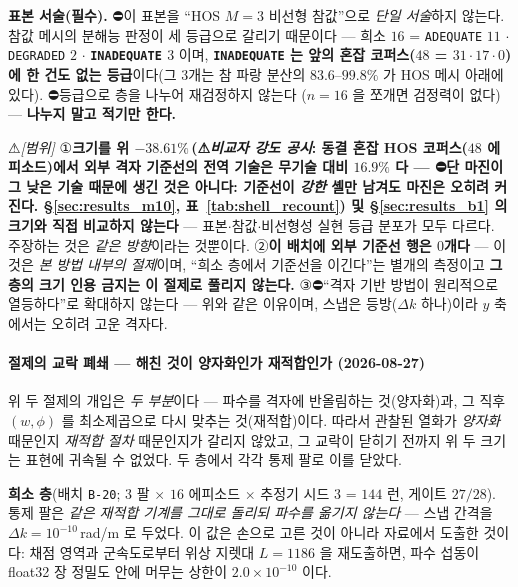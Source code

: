 \documentclass[11pt]{report}
\numberwithin{equation}{chapter}
\numberwithin{figure}{chapter}
\numberwithin{table}{chapter}
\newcommand{\CmpSkill}{\,(⚠\emph{비교자 강도 공시}: 동결 혼잡 HOS 코퍼스($48$ 에피소드)에서
\textbf{외부 격자 기준선}의 전역 기술은 무기술 대비 $16.9\%$ 다 --- ⛔단 마진이 그 낮은
기술 때문에 생긴 것은 아니다: 기준선이 \emph{강한} 셸만 남겨도 마진은 오히려 커진다.
\S\ref{sec:results_m10}, 표~\ref{tab:shell_recount})}
\begin{document}
\textbf{표본 서술(필수).} ⛔이 표본을 ``HOS $M{=}3$ 비선형 참값''으로 \emph{단일
서술}하지 않는다. 참값 메시의 분해능 판정이 세 등급으로 갈리기 때문이다 --- 희소
$16$ = \texttt{ADEQUATE} $11$ $\cdot$ \texttt{DEGRADED} $2$ $\cdot$
\textbf{\texttt{INADEQUATE} $3$} 이며, \textbf{\texttt{INADEQUATE} 는 앞의 혼잡
코퍼스($48$ = $31\cdot17\cdot0$)에 한 건도 없는 등급}이다(그 $3$개는 참 파랑 분산의
$83.6$--$99.8\%$ 가 HOS 메시 아래에 있다). ⛔등급으로 층을 나누어 재검정하지 않는다
($n = 16$ 을 쪼개면 검정력이 없다) --- \textbf{나누지 말고 적기만 한다.}

⚠\emph{[범위]} ①\textbf{크기를 위 $-38.61\%$\CmpSkill{} 및 \S\ref{sec:results_b1} 의 크기와
직접 비교하지 않는다} --- 표본$\cdot$참값$\cdot$비선형성 실현 등급 분포가 모두 다르다.
주장하는 것은 \emph{같은 방향}이라는 것뿐이다.
②\textbf{이 배치에 외부 기준선 행은 $0$개다} --- 이것은 \emph{본 방법 내부의 절제}이며,
``희소 층에서 기준선을 이긴다''는 별개의 측정이고 \textbf{그 층의 크기 인용 금지는 이
절제로 풀리지 않는다.} ③⛔``격자 기반 방법이 원리적으로 열등하다''로 확대하지 않는다
--- 위와 같은 이유이며, 스냅은 등방($\Delta k$ 하나)이라 $y$ 축에서는 오히려 고운 격자다.

\paragraph{절제의 교락 폐쇄 --- 해친 것이 양자화인가 재적합인가 (2026-08-27)}
\label{sec:ablation_confound}
위 두 절제의 개입은 \emph{두 부분}이다 --- 파수를 격자에 반올림하는 것(양자화)과, 그
직후 $(w,\phi)$ 를 최소제곱으로 다시 맞추는 것(재적합)이다. 따라서 관찰된 열화가
\emph{양자화} 때문인지 \emph{재적합 절차} 때문인지가 갈리지 않았고, 그 교락이 닫히기
전까지 위 두 크기는 표현에 귀속될 수 없었다. 두 층에서 각각 통제 팔로 이를 닫았다.

\textbf{희소 층}(배치 \texttt{B-20}; $3$ 팔 $\times$ $16$ 에피소드 $\times$ 추정기 시드
$3$ = $144$ 런, 게이트 $27/28$). 통제 팔은 \emph{같은 재적합 기계를 그대로 돌리되 파수를
옮기지 않는다} --- 스냅 간격을 $\Delta k = 10^{-10}$\,rad/m 로 두었다. 이 값은 손으로 고른
것이 아니라 자료에서 도출한 것이다: 채점 영역과 군속도로부터 위상 지렛대 $L = 1186$ 을
재도출하면, 파수 섭동이 float32 장 정밀도 안에 머무는 상한이 $2.0\times10^{-10}$ 이다.
\end{document}
